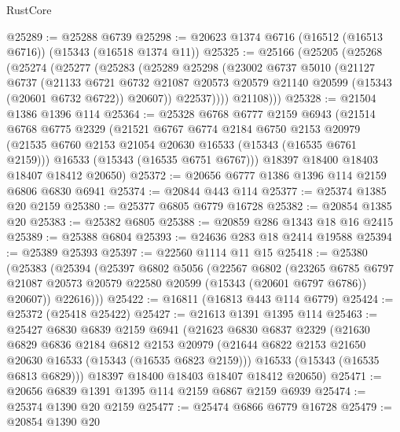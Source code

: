 \begin{lexlean}{RustCore}
\begin{coremodule}
@25289 := @25288 @6739
@25298 := @20623 @1374 @6716 (@16512 (@16513 @6716)) (@15343 (@16518 @1374 @11))
@25325 := @25166
    (@25205
      (@25268
        (@25274
          (@25277
            (@25283
              (@25289
                @25298
                (@23002
                  @6737
                  @5010
                  (@21127
                    @6737
                    (@21133
                      @6721
                      @6732
                      @21087
                      @20573
                      @20579
                      @21140
                      @20599
                      (@15343 (@20601 @6732 @6722))
                      @20607))
                  @22537))))
          @21108)))
@25328 := @21504 @1386 @1396 @114
@25364 := @25328
    @6768
    @6777
    @2159
    @6943
    (@21514
      @6768
      @6775
      @2329
      (@21521
        @6767
        @6774
        @2184
        @6750
        @2153
        @20979
        (@21535 @6760 @2153 @21054 @20630 @16533 (@15343 (@16535 @6761 @2159)))
        @16533
        (@15343 (@16535 @6751 @6767)))
      @18397
      @18400
      @18403
      @18407
      @18412
      @20650)
@25372 := @20656 @6777 @1386 @1396 @114 @2159 @6806 @6830 @6941
@25374 := @20844 @443 @114
@25377 := @25374 @1385 @20 @2159
@25380 := @25377 @6805 @6779 @16728
@25382 := @20854 @1385 @20
@25383 := @25382 @6805
@25388 := @20859 @286 @1343 @18 @16 @2415
@25389 := @25388 @6804
@25393 := @24636 @283 @18 @2414 @19588
@25394 := @25389 @25393
@25397 := @22560 @1114 @11 @15
@25418 := @25380
    (@25383
      (@25394
        (@25397
          @6802
          @5056
          (@22567
            @6802
            (@23265
              @6785
              @6797
              @21087
              @20573
              @20579
              @22580
              @20599
              (@15343 (@20601 @6797 @6786))
              @20607))
          @22616)))
@25422 := @16811 (@16813 @443 @114 @6779)
@25424 := @25372 (@25418 @25422)
@25427 := @21613 @1391 @1395 @114
@25463 := @25427
    @6830
    @6839
    @2159
    @6941
    (@21623
      @6830
      @6837
      @2329
      (@21630
        @6829
        @6836
        @2184
        @6812
        @2153
        @20979
        (@21644 @6822 @2153 @21650 @20630 @16533 (@15343 (@16535 @6823 @2159)))
        @16533
        (@15343 (@16535 @6813 @6829)))
      @18397
      @18400
      @18403
      @18407
      @18412
      @20650)
@25471 := @20656 @6839 @1391 @1395 @114 @2159 @6867 @2159 @6939
@25474 := @25374 @1390 @20 @2159
@25477 := @25474 @6866 @6779 @16728
@25479 := @20854 @1390 @20

\end{coremodule}
\end{lexlean}
